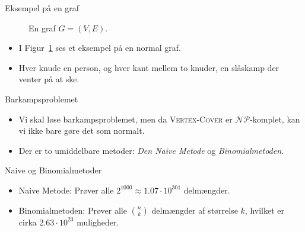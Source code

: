 \begin{frame}{Eksempel på en graf}
    \begin{figure}
        \centering
        \caption{\label{fig:barfightvertexcover} En graf $G = (V,E)$.}
    \end{figure}
    \begin{itemize}
        \item I Figur~\ref{fig:barfightvertexcover} ses et eksempel på en normal graf.
        \item Hver knude en person, og hver kant mellem to knuder, en slåskamp der venter på at ske.
    \end{itemize}
\end{frame}

\begin{frame}{Barkampsproblemet}
    \begin{itemize}
        \item Vi skal løse barkampsproblemet, men da \textsc{Vertex-Cover} er $\mathcal{NP}$-komplet, kan vi ikke bare gøre det som normalt.
        \item Der er to umiddelbare metoder: \textit{Den Naive Metode} og \textit{Binomialmetoden}.
    \end{itemize}
\end{frame}

\begin{frame}{Naive og Binomialmetoder}
    \begin{itemize}
        \item Naive Metode: Prøver alle $2^{1000} \approx 1.07 \cdot 10^{301}$ delmængder.
        \item Binomialmetoden: Prøver alle $\binom{n}{k}$ delmængder af størrelse $k$, hvilket er cirka $2.63 \cdot 10^{23}$ muligheder.
    \end{itemize}
\end{frame}

